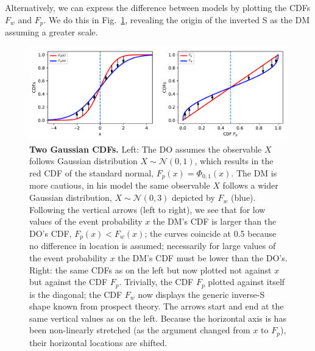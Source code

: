 \documentclass[a4paper, 12pt]{article}
\newcommand{\eref}[1]{(Eq.~\ref{eq:#1})}
\newcommand{\flabel}[1]{\label{fig:#1}}
\newcommand{\fref}[1]{Fig.~\ref{fig:#1}}
\newcommand{\be}{\begin{equation}}
\newcommand{\ee}{\end{equation}}
\newcommand{\ND}{\mathcal{N}} %
\newcommand{\MK}[1]{{\it ***MK: #1 MK***}}
\begin{document}
%
%

Alternatively, we can express the difference between models by plotting the CDFs $F_w$ and $F_p$. We do this in \fref{TwoCDFs}, revealing the origin of the inverted S as the DM assuming a greater scale.

\begin{figure}[!htb]
\centering
\includegraphics[width=\textwidth]{./figs/GaussianFvsXtoWvsP.pdf}
\caption{{\bf Two Gaussian CDFs.} 
Left: The DO assumes the observable $X$ follows Gaussian distribution $X \sim \ND(0,1)$, which results in the red CDF of the standard normal, $F_p(x) = \Phi_{0,1}(x)$. The DM is more cautious, in his model the same observable $X$ follows a wider Gaussian distribution, $X \sim \ND(0,3)$ depicted by $F_w$ (blue). 
% 
Following the vertical arrows (left to right), we see that for low values of the event probability $x$ the DM's CDF is larger than the DO's CDF, $F_p(x) < F_w(x)$; the curves coincide at 0.5 because no difference in location is assumed; necessarily for large values of the event probability $x$ the DM's CDF must be lower than the DO's.
Right: the same CDFs as on the left but now plotted not against $x$ but against the CDF $F_p$. Trivially, the CDF $F_p$ plotted against itself is the diagonal; the CDF $F_w$ now displays the generic inverse-S shape known from prospect theory. The arrows start and end at the same vertical values as on the left. Because the horizontal axis is has been non-linearly stretched (as the argument changed from $x$ to $F_p$), their horizontal locations are shifted.
}
\flabel{TwoCDFs}
\end{figure}
\end{document}
